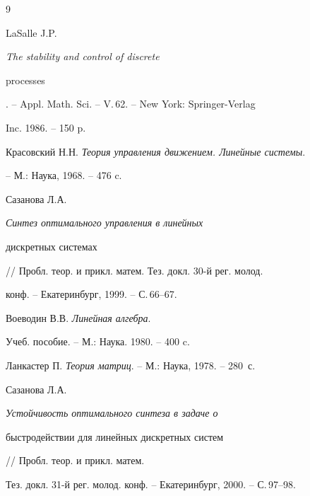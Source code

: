 \begin{thebibliography}{9}







LaSalle J.P. {\em The stability and control of discrete


processes}. -- Appl. Math. Sci. -- V.\,62. -- New York: Springer-Verlag


Inc. 1986. -- 150 p.







Красовский Н.Н. {\em Теория управления движением. Линейные системы}.


-- М.: Наука, 1968. -- 476 c.







Сазанова Л.А. {\em Синтез оптимального управления в линейных


дискретных системах}


// Пробл. теор. и прикл. матем. Тез. докл. 30-й рег. молод.


конф. -- Екатеринбург, 1999. -- С.\,66--67.







Воеводин В.В. {\em Линейная алгебра}.


Учеб. пособие. -- М.: Наука. 1980. -- 400 c.







Ланкастер П. {\em Теория матриц}. -- М.: Наука, 1978. -- 280~с.







Сазанова Л.А. {\em Устойчивость оптимального синтеза в задаче о


быстродействии для линейных дискретных систем} // Пробл. теор. и прикл. матем.


Тез. докл. 31-й рег. молод. конф. -- Екатеринбург, 2000. -- С.\,97--98.





\end{thebibliography}





